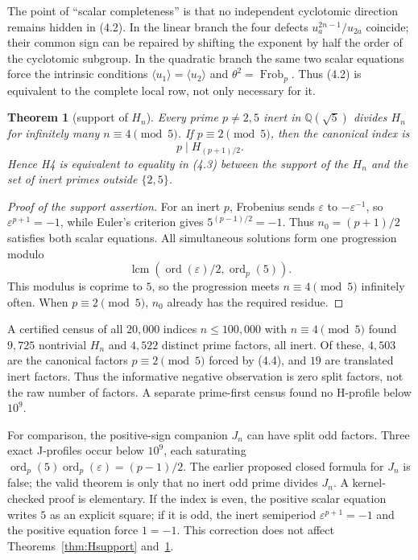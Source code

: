 \documentclass[11pt]{amsart}
\newtheorem{theorem}{Theorem}[section]
\theoremstyle{definition}
\theoremstyle{remark}
\newcommand{\Q}{\mathbb{Q}}
\newcommand{\eps}{\varepsilon}
\newcommand{\ord}{\operatorname{ord}}
\newcommand{\lcm}{\operatorname{lcm}}
\begin{document}
The point of ``scalar completeness'' is that no independent cyclotomic
direction remains hidden in (4.2). In the linear branch the four defects
$u_a^{2n-1}/u_{2a}$ coincide; their common sign can be repaired by shifting
the exponent by half the order of the cyclotomic subgroup. In the quadratic
branch the same two scalar equations force the intrinsic conditions
$\langle u_1\rangle=\langle u_2\rangle$ and
$\theta^2=\operatorname{Frob}_p$. Thus (4.2) is equivalent to the complete
local row, not only necessary for it.

\begin{theorem}[support of $H_n$]\label{thm:Hcanonical}
Every prime $p\ne2,5$ inert in $\Q(\sqrt5)$ divides $H_n$ for infinitely
many $n\equiv4\pmod5$. If $p\equiv2\pmod5$, then the canonical index is
\[
p\mid H_{(p+1)/2}.
\tag{4.4}
\]
Hence H4 is equivalent to equality in (4.3) between the support of the
$H_n$ and the set of inert primes outside $\{2,5\}$.
\end{theorem}

\begin{proof}[Proof of the support assertion]
For an inert $p$, Frobenius sends $\eps$ to $-\eps^{-1}$, so
$\eps^{p+1}=-1$, while Euler's criterion gives
$5^{(p-1)/2}=-1$. Thus $n_0=(p+1)/2$ satisfies both scalar equations.
All simultaneous solutions form one progression modulo
\[
\lcm\!\left(\ord(\eps)/2,\ord_p(5)\right).
\]
This modulus is coprime to $5$, so the progression meets
$n\equiv4\pmod5$ infinitely often. When $p\equiv2\pmod5$, $n_0$ already
has the required residue.
\end{proof}

A certified census of all $20{,}000$ indices $n\le100{,}000$ with
$n\equiv4\pmod5$ found $9{,}725$ nontrivial $H_n$ and $4{,}522$ distinct
prime factors, all inert. Of these, $4{,}503$ are the canonical factors
$p\equiv2\pmod5$ forced by (4.4), and $19$ are translated inert factors.
Thus the informative negative observation is zero split factors, not the
raw number of factors. A separate prime-first census found no H-profile
below $10^9$.

For comparison, the positive-sign companion $J_n$ can have split odd
factors. Three exact J-profiles occur below $10^9$, each saturating
$\ord_p(5)\ord_p(\eps)=(p-1)/2$. The earlier proposed closed formula for
$J_n$ is false; the valid theorem is only that no inert odd prime divides
$J_n$. A kernel-checked proof is elementary. If the index is even, the
positive scalar equation writes \(5\) as an explicit square; if it is
odd, the inert semiperiod \(\eps^{p+1}=-1\) and the positive equation
force \(1=-1\). This correction does not affect
Theorems~\ref{thm:Hsupport} and~\ref{thm:Hcanonical}.
\end{document}
